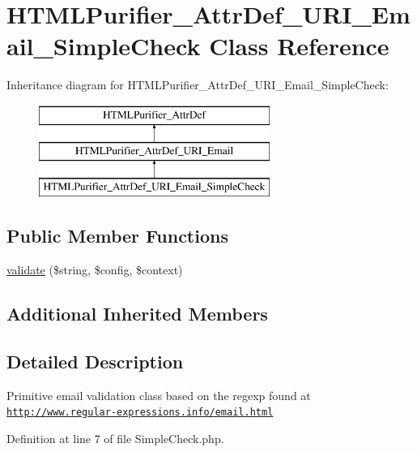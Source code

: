 \hypertarget{classHTMLPurifier__AttrDef__URI__Email__SimpleCheck}{\section{H\+T\+M\+L\+Purifier\+\_\+\+Attr\+Def\+\_\+\+U\+R\+I\+\_\+\+Email\+\_\+\+Simple\+Check Class Reference}
\label{classHTMLPurifier__AttrDef__URI__Email__SimpleCheck}
}
Inheritance diagram for H\+T\+M\+L\+Purifier\+\_\+\+Attr\+Def\+\_\+\+U\+R\+I\+\_\+\+Email\+\_\+\+Simple\+Check\+:\begin{figure}[H]
\begin{center}
\leavevmode
\includegraphics[height=3.000000cm]{classHTMLPurifier__AttrDef__URI__Email__SimpleCheck}
\end{center}
\end{figure}
\subsection*{Public Member Functions}
\begin{DoxyCompactItemize}
\item 
\hyperlink{classHTMLPurifier__AttrDef__URI__Email__SimpleCheck_ab59eb8d68c2cefed8c58d93e741aea0f}{validate} (\$string, \$config, \$context)
\end{DoxyCompactItemize}
\subsection*{Additional Inherited Members}


\subsection{Detailed Description}
Primitive email validation class based on the regexp found at \href{http://www.regular-expressions.info/email.html}{\tt http\+://www.\+regular-\/expressions.\+info/email.\+html} 

Definition at line 7 of file Simple\+Check.\+php.



